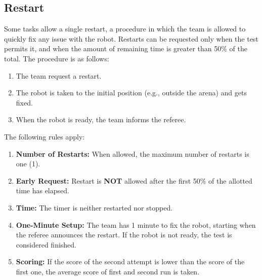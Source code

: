 \subsection{Restart}
\label{rule:restart}
Some tasks allow a single restart, a procedure in which the team is allowed to quickly fix any issue with the robot.
Restarts can be requested only when the test permits it, and when the amount of remaining time is greater than 50\% of the total.
The procedure is as follows:

\begin{enumerate}
	\item The team request a restart.
	\item The robot is taken to the initial position (e.g., outside the arena) and gets fixed.
	\item When the robot is ready, the team informs the referee.
\end{enumerate}

The following rules apply:
\begin{enumerate}
	\item \textbf{Number of Restarts:} When allowed, the maximum number of restarts is one (1).
	
	\item \textbf{Early Request:} Restart is \textbf{NOT} allowed after the first 50\% of the allotted time has elapsed.
	
	\item \textbf{Time:} The timer is neither restarted nor stopped.
	
	\item \textbf{One-Minute Setup:} The team has 1 minute to fix the robot, starting when the referee announces the restart.
	If the robot is not ready, the test is considered finished.
	
	\item \textbf{Scoring:} If the score of the second attempt is lower than the score of the first one, the average score of first and second run is taken.
\end{enumerate}

